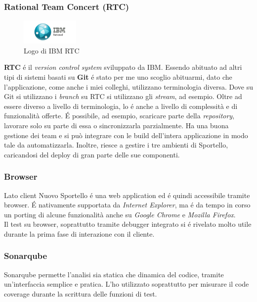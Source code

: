 \subsubsection{Rational Team Concert (RTC)}

\begin{figure}
    \begin{center}
        \includegraphics[width=0.25\textwidth]{./res/img/1-IBM-rational-1.png}
        \caption{Logo di IBM RTC}
    \end{center}
\end{figure}

\textbf{RTC} é il \textit{version control system} sviluppato da IBM. Essendo abituato ad altri tipi di sistemi basati su \textbf{Git} é stato per me uno scoglio abituarmi, dato che l'applicazione, come anche i miei colleghi, utilizzano terminologia diversa. Dove su Git si utilizzano i \textit{branch} su RTC si utilizzano gli \textit{stream}, ad esempio. Oltre ad essere diverso a livello di terminologia, lo é anche a livello di complessità e di funzionalità offerte. É possibile, ad esempio, scaricare parte della \textit{repository}, lavorare solo su parte di essa o sincronizzarla parzialmente. Ha una buona gestione dei team e si può integrare con le build dell'intera applicazione in modo tale da automatizzarla. Inoltre, riesce a gestire i tre ambienti di Sportello, caricandosi del deploy di gran parte delle sue componenti. 

\subsubsection{Browser}
Lato client Nuovo Sportello é una web application ed é quindi accessibile tramite browser. É nativamente supportata da \textit{Internet Explorer}, ma é da tempo in corso un porting di alcune funzionalità anche su \textit{Google Chrome} e \textit{Mozilla Firefox}. \\
Il test su browser, soprattutto tramite debugger integrato si é rivelato molto utile durante la prima fase di interazione con il cliente. 

\subsubsection{Sonarqube}
Sonarqube permette l'analisi sia statica che dinamica del codice, tramite un'interfaccia semplice e pratica. L'ho utilizzato soprattutto per misurare il code coverage durante la scrittura delle funzioni di test. 

